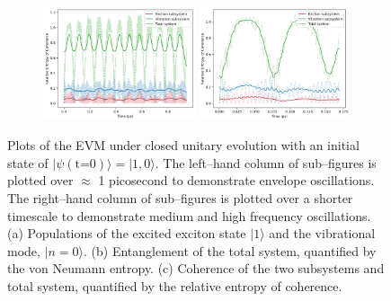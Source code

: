 \documentclass[11pt]{article}
\begin{document}
\begin{figure}[H]
    \vspace{0.8em}

    \begin{subfigure}{\textwidth}
        \centering
        \includegraphics[width=0.49\textwidth]{Research Project/Code/results/ExVib/Closed/Envelope/coh.png}
        \hfill
        \includegraphics[width=0.49\textwidth]{Research Project/Code/results/ExVib/Closed/Fast/coh.png}
        \caption{}
        \label{fig:EVM_CQS_Coh_e0}
    \end{subfigure}

    \caption{Plots of the EVM under closed unitary evolution with an initial state of $|\psi (\text{t=0})\rangle = |1, 0\rangle$. The left--hand column of sub--figures is plotted over $\approx$ 1 picosecond to demonstrate envelope oscillations. The right--hand column of sub--figures is plotted over a shorter timescale to demonstrate medium and high frequency oscillations. (a) Populations of the excited exciton state $|1\rangle$ and the vibrational mode, $|n=0\rangle$. (b) Entanglement of the total system, quantified by the von Neumann entropy. (c) Coherence of the two subsystems and total system, quantified by the relative entropy of coherence.} 
    \label{fig:EVM_CQS_e0}
\end{figure}
\end{document}
